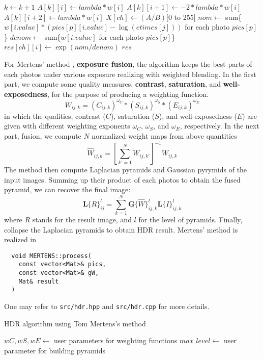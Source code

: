 \begin{algorithm}
\begin{algorithmic}[1]
      \State $k\gets k+1$
      \State $A[k][i]\gets lambda*w[i]$
      \State $A[k][i+1]\gets -2*lambda*w[i]$
      \State $A[k][i+2]\gets lambda*w[i]$
    \EndFor
    \State $X[ch]\gets (A/B)$[0 to 255]
  \EndFor	
      \State $nom\gets$ sum\{$w[i.value]*(pics[p][i.value]-\log(etimes[j]))$ for each photo $pics[p]$\}
      \State $denom\gets$ sum\{$w[i.value]$ for each photo $pics[p]$\}
      \State $res[ch][i]\gets\exp(nom/denom)$
    \EndFor
  \EndFor
  \State\Return $res$
\EndFunction
\end{algorithmic}
\end{algorithm}

\newpage 
For Mertens' method \cite{ref:mertens}, \textbf{exposure fusion}, the algorithm keeps the best parts of each photos under various exposure realizing with weighted blending. In the first part, we compute some quality measures, \textbf{contrast}, \textbf{saturation}, and \textbf{well-exposedness}, for the purpose of producing a weighting function.
$$ W_{ij,k}=(C_{ij,k})^{\omega_C}*(S_{ij,k})^{\omega_S}*(E_{ij,k})^{\omega_E} $$
in which the qualities, contrast ($C$), saturation ($S$), and well-exposedness ($E$) are given with different weighting exponents $\omega_C$, $\omega_S$, and $\omega_E$, respectively. 
In the next part, fusion, we compute $N$ normalized weight maps from above quantities
$$\hat{W}_{ij,k}= \left[ \sum_{k'=1}^N W_{ij,k'} \right]^{-1}{W}_{ij,k}$$
The method then compute Laplacian pyramids and Gaussian pyrymids of the input images. Summing up their product of each photos to obtain the fused pyramid, we can recover the final image:
$$ \textbf{L}\{R\}^l_{ij}=\sum_{k=1}^N\textbf{G}\{\hat{W}\}^l_{ij,k}\textbf{L}\{I\}^l_{ij,k} $$
where $R$ stands for the result image, and $l$ for the level of pyramids. Finally, collapse the Laplacian pyramids to obtain HDR result. Mertens' method is realized in 
\begin{lstlisting}
  void MERTENS::process(
    const vector<Mat>& pics,
    const vector<Mat>& gW, 
    Mat& result
  )
\end{lstlisting}
One may refer to \texttt{src/hdr.hpp} and \texttt{src/hdr.cpp} for more details.

\begin{algorithm}
\caption{HDR algorithm using Tom Mertens's method \cite{ref:mertens}}
\begin{algorithmic}[1]
\State $wC, wS, wE\gets$ user parameters for weighting functions
\State $max\_level\gets$ user parameter for building pyramids
\end{algorithmic}
\end{algorithm}

